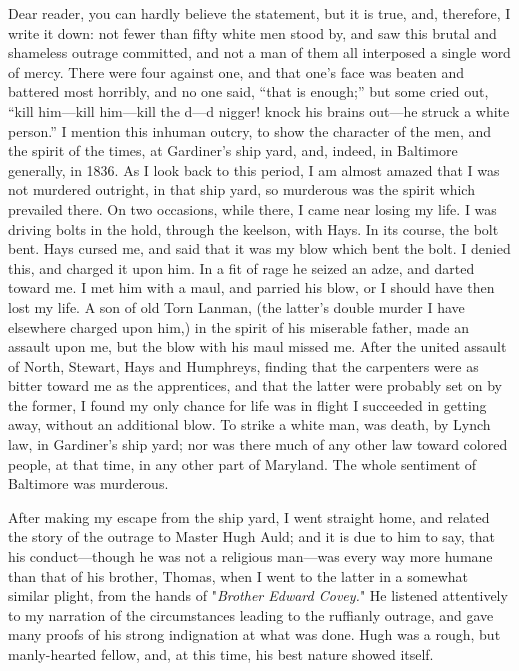 Dear reader, you can hardly believe the statement, but it is true, and,
therefore, I write it down: not fewer than fifty white men stood by, and
saw this brutal and shameless outrage committed, and not a man of them
all interposed a single word of mercy. There were four against one, and
that one's face was beaten and battered most horribly, and no one said,
``that is enough;'' but some cried out, ``kill him---kill him---kill the
d---d nigger! knock his brains out---he struck a white person.'' I
mention this inhuman outcry, to show the character of the men, and the
spirit of the times, at Gardiner's ship yard, and, indeed, in Baltimore
generally, in 1836. As I look back to this period, I am almost amazed
that I was not murdered outright, in that ship yard, so murderous was
the spirit which prevailed there. On two occasions, while there, I came
near losing my life. I was driving bolts in the hold, through the
keelson, with Hays. In its course, the bolt bent. Hays cursed me, and
said that it was my blow which bent the bolt. I denied this, and charged
it upon him. In a fit of rage he seized an adze, and darted toward me. I
met him with a maul, and parried his blow, or I should have then lost my
life. A son of old Torn Lanman, (the latter's double murder I have
elsewhere charged upon him,) in the spirit of his miserable father, made
an assault upon me, but the blow with his maul missed me. After the
united assault of North, Stewart, Hays and Humphreys, finding that the
{}carpenters were as bitter toward me as the apprentices, and that the
latter were probably set on by the former, I found my only chance for
life was in flight I succeeded in getting away, without an additional
blow. To strike a white man, was death, by Lynch law, in Gardiner's ship
yard; nor was there much of any other law toward colored people, at that
time, in any other part of Maryland. The whole sentiment of Baltimore
was murderous.

After making my escape from the ship yard, I went straight home, and
related the story of the outrage to Master Hugh Auld; and it is due to
him to say, that his conduct---though he was not a religious man---was
every way more humane than that of his brother, Thomas, when I went to
the latter in a somewhat similar plight, from the hands of
"\emph{Brother Edward Covey.}" He listened attentively to my narration
of the circumstances leading to the ruffianly outrage, and gave many
proofs of his strong indignation at what was done. Hugh was a rough, but
manly-hearted fellow, and, at this time, his best nature showed itself.

